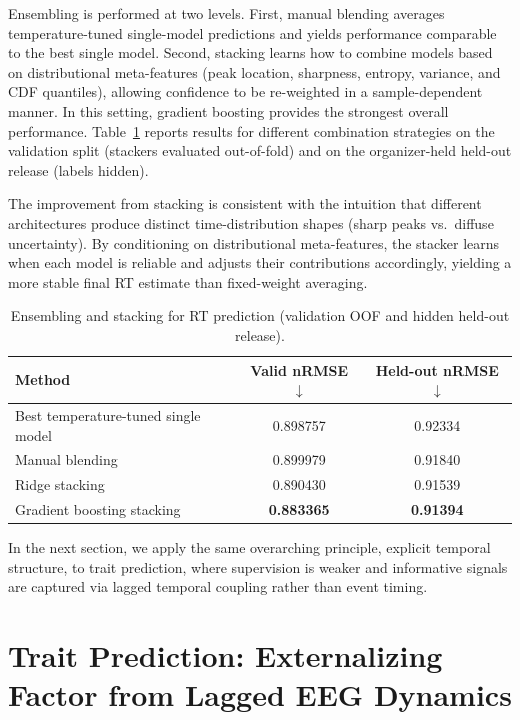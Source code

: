 \documentclass[12pt]{article}
\begin{document}
Ensembling is performed at two levels. First, manual blending averages temperature-tuned single-model predictions and
yields performance comparable to the best single model. Second, stacking learns how to combine models based on
distributional meta-features (peak location, sharpness, entropy, variance, and CDF quantiles), allowing confidence to be
re-weighted in a sample-dependent manner. In this setting, gradient boosting provides the strongest overall performance.
Table~\ref{tab:stacking} reports results for different combination strategies on the validation split (stackers evaluated
out-of-fold) and on the organizer-held held-out release (labels hidden).


The improvement from stacking is consistent with the intuition that different architectures produce distinct
time-distribution shapes (sharp peaks vs.\ diffuse uncertainty). By conditioning on distributional meta-features, the
stacker learns when each model is reliable and adjusts their contributions accordingly, yielding a more stable final RT
estimate than fixed-weight averaging.

\begin{table}[!t]
\centering
\caption{Ensembling and stacking for RT prediction (validation OOF and hidden held-out release).}
\label{tab:stacking}
\small
\setlength{\tabcolsep}{8pt}
\renewcommand{\arraystretch}{1.15}
\begin{tabular}{lcc}
\hline
\textbf{Method} & \textbf{Valid nRMSE} $\downarrow$ & \textbf{Held-out nRMSE} $\downarrow$ \\
\hline
Best temperature-tuned single model      & 0.898757 & 0.92334 \\
Manual blending                          & 0.899979 & 0.91840 \\
Ridge stacking                           & 0.890430 & 0.91539 \\
Gradient boosting stacking               & \textbf{0.883365} & \textbf{0.91394} \\
\hline
\end{tabular}
\end{table}

In the next section, we apply the same overarching principle, explicit temporal structure, to trait prediction, where
supervision is weaker and informative signals are captured via lagged temporal coupling rather than event timing.


\section{Trait Prediction: Externalizing Factor from Lagged EEG Dynamics}
\label{sec:ch2_externalizing}
\end{document}
